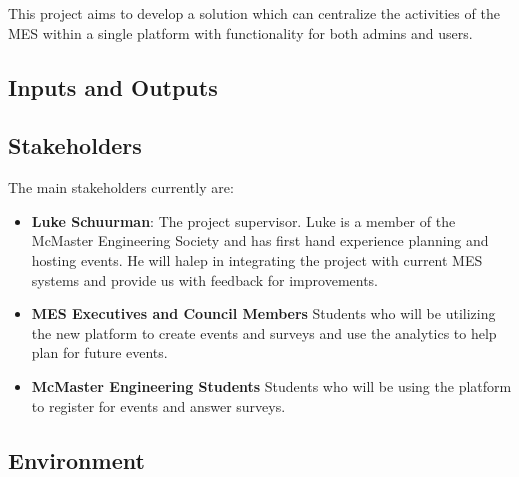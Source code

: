 \documentclass{article}
\begin{document}
This project aims to develop a solution which can centralize the activities of the MES within a single platform with functionality for both admins and users.
\subsection{Inputs and Outputs}


\subsection{Stakeholders}
The main stakeholders currently are:
\begin{itemize}
    \item \textbf{Luke Schuurman}: The project supervisor.\newline
        Luke is a member of the McMaster Engineering Society and has first hand experience planning and hosting events. He will halep in integrating the project with current MES systems and provide us with feedback for improvements. 
    \item \textbf{MES Executives and Council Members}\newline
        Students who will be utilizing the new platform to create events and surveys and use the analytics to help plan for future events.
    \item \textbf{McMaster Engineering Students} \newline
        Students who will be using the platform to register for events and answer surveys.
\end{itemize}
\subsection{Environment}

\end{document}
